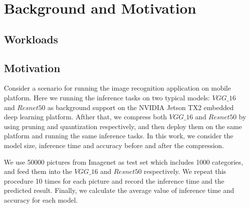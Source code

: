 \section{Background and Motivation}
\subsection{Workloads}

\subsection{Motivation}
Consider a scenario for running the image recognition application on mobile platform.
Here we running the inference tasks on
two typical models: $VGG\_16$ and $Resnet50$ as background 
support on the NVIDIA Jetson TX2 embedded deep learning platform.
Afther that, we compress both $VGG\_16$ and $Resnet50$ by using pruning 
and quantization respectively, and then deploy them on the same platform
and running the same inference tasks.
In this work, we consider the
model size, inference time and accuracy before and after the compression.

We use 50000 pictures from Imagenet as test set
which includes 1000 categories,
and feed them into the $VGG\_16$ and $Resnet50$ respectively. 
We repeat this procedure 10 times for each picture
and record the inference time and the predicted result.
Finally, we calculate the average value of inference time and accuracy
for each model.

